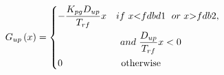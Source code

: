 \documentclass[journal]{IEEEtran}
\begin{document}
	\begin{equation}\label{Gup}
	G_{up}\left( {x}\right) =\left\{ \begin{aligned}
	&{-\frac{{K_{pg}}{D_{up}}}{T_{rf}}}{x}{\kern 10pt} {{if}}{\kern 1pt} {\kern 1pt} {\kern 1pt}{x}{<} fdbd1{\kern 1pt} {\kern 1pt} {\kern 1pt}{\kern 1pt} {\kern 1pt} {\kern 1pt}{or}{\kern 1pt} {\kern 1pt} {\kern 1pt}{x}{>}fdb2, {\kern 1pt} {\kern 1pt} {\kern 1pt}\!\!\!\!\!\!\!\!\!\\\!\!\!\!\!\!\!\!\!
	&{\kern 65pt}{and}{\kern 1pt} {\kern 1pt} {\kern 1pt}{\frac{{D_{up}}}{T_{rf}}} {x} < 0\!\!\!\!\!\!\!\!\!\\\!\!\!\!\!\!\!\!\!
	&0{\kern 1pt} {\kern 1pt} {\kern 1pt} {\kern 1pt} {\kern 1pt}{\kern 1pt} {\kern 1pt} {\kern 1pt} {\kern 1pt} {\kern 1pt} {\kern 1pt} {\kern 1pt} {\kern 1pt} {\kern 1pt} {\kern 1pt}{\kern 1pt} {\kern 1pt} {\kern 1pt} {\kern 1pt} {\kern 1pt} {\kern 1pt} {\kern 1pt} {\kern 1pt} {\kern 1pt} {\kern 1pt}{\kern 1pt} {\kern 1pt} {\kern 1pt} {\kern 1pt} {\kern 1pt} {\kern 1pt} {\kern 1pt} {\kern 1pt} {\kern 1pt} {\kern 1pt}{\kern 1pt} {\kern 1pt} {\kern 1pt} {\kern 1pt} {\kern 1pt} {\kern 1pt} {\kern 1pt} {\kern 1pt} {\kern 1pt} {\kern 1pt}{\kern 1pt} {\kern 1pt} {\kern 1pt} {\kern 1pt} {\kern 1pt} {\kern 1pt} {\kern 1pt} {\kern 1pt} {\kern 1pt} {\kern 1pt}{\kern 1pt} {\kern 1pt} {\kern 1pt}{\kern 1pt} {\kern 1pt} {\kern 1pt}\rm{otherwise}\!\!\!\!\!\!\!\!\!
	\end{aligned} \right.
	\end{equation}
\end{document}
